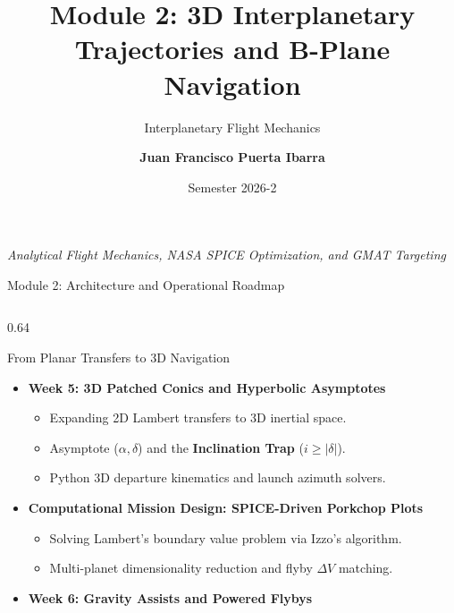 \documentclass[aspectratio=169, 10pt]{beamer}
\title[Astrodynamics Module 2]{\textbf{Module 2: 3D Interplanetary Trajectories and B-Plane Navigation}}
\subtitle{Interplanetary Flight Mechanics}
\author{\textbf{Juan Francisco Puerta Ibarra}}
\institute{Aerospace Engineering}
\date{Semester 2026-2}
\begin{document}
\begin{frame}[plain]
    \titlepage
    \begin{center}
        \scriptsize \textcolor{DarkSlate}{\textit{Analytical Flight Mechanics, NASA SPICE Optimization, and GMAT Targeting}}
    \end{center}
\end{frame}

\begin{frame}{Module 2: Architecture and Operational Roadmap}
    \begin{columns}[T]
        \begin{column}{0.64\textwidth}
            \begin{block}{From Planar Transfers to 3D Navigation}
                \scriptsize %
                \begin{itemize}\setlength{\itemsep}{1.5pt}\setlength{\topsep}{1pt}
                    \item \textbf{Week 5: 3D Patched Conics and Hyperbolic Asymptotes}
                    \begin{itemize}\setlength{\itemsep}{0pt}
                        \item Expanding 2D Lambert transfers to 3D inertial space.
                        \item Asymptote ($\alpha, \delta$) and the \textbf{Inclination Trap} ($i \ge |\delta|$).
                        \item Python 3D departure kinematics and launch azimuth solvers.
                    \end{itemize}
                    \item \textbf{Computational Mission Design: SPICE-Driven Porkchop Plots}
                    \begin{itemize}\setlength{\itemsep}{0pt}
                        \item Solving Lambert's boundary value problem via Izzo's algorithm.
                        \item Multi-planet dimensionality reduction and flyby $\Delta V$ matching.
                    \end{itemize}
                    \item \textbf{Week 6: Gravity Assists and Powered Flybys}

\end{itemize}
\end{block}
\end{column}
\end{columns}
\end{frame}
\end{document}
